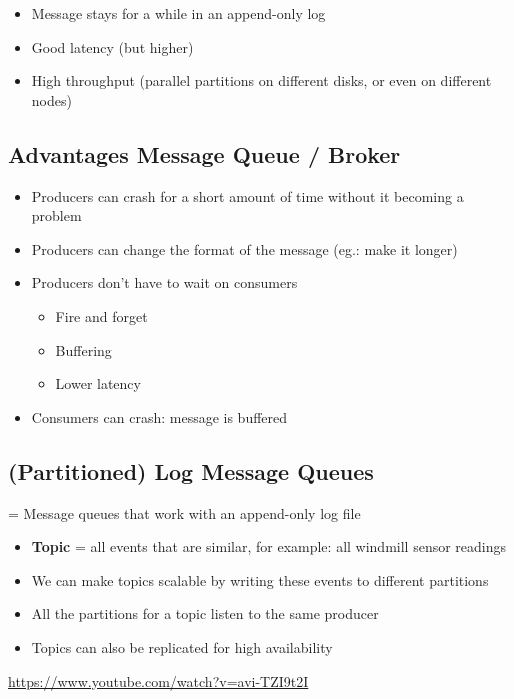 \documentclass{article}
\begin{document}
\begin{itemize}
    \item Message stays for a while in an append-only log
    \item Good latency (but higher)
    \item High throughput (parallel partitions on different disks, or even on different nodes) 
\end{itemize}

\subsection{Advantages Message Queue / Broker}

\begin{itemize}
    \item Producers can crash for a short amount of time without it becoming a problem
    \item Producers can change the format of the message (eg.: make it longer)
    \item Producers don't have to wait on consumers
    \begin{itemize}
        \item Fire and forget
        \item Buffering
        \item Lower latency
    \end{itemize}
    \item Consumers can crash: message is buffered
\end{itemize}

\subsection{(Partitioned) Log Message Queues}

= Message queues that work with an append-only log file

\begin{itemize}
    \item \textbf{Topic} = all events that are similar, for example: all windmill sensor readings
    \item We can make topics scalable by writing these events to different partitions
    \item All the partitions for a topic listen to the same producer
    \item Topics can also be replicated for high availability
\end{itemize}

\url{https://www.youtube.com/watch?v=avi-TZI9t2I}
\end{document}
